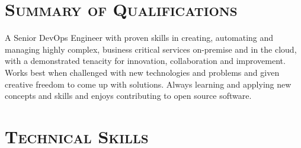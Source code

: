\documentclass[11pt,letter,roman]{moderncv}
\begin{document}
\makecvtitle{}
\vspace{-\baselineskip}

\section{\textsc{Summary of Qualifications}}
A Senior DevOps Engineer with proven skills in creating, automating and
managing highly complex, business critical services on-premise and in the
cloud, with a demonstrated tenacity for innovation, collaboration and
improvement. Works best when challenged with new technologies and problems and
given creative freedom to come up with solutions. Always learning and applying
new concepts and skills and enjoys contributing to open source software.

\section{\textsc{Technical Skills}}
\end{document}
